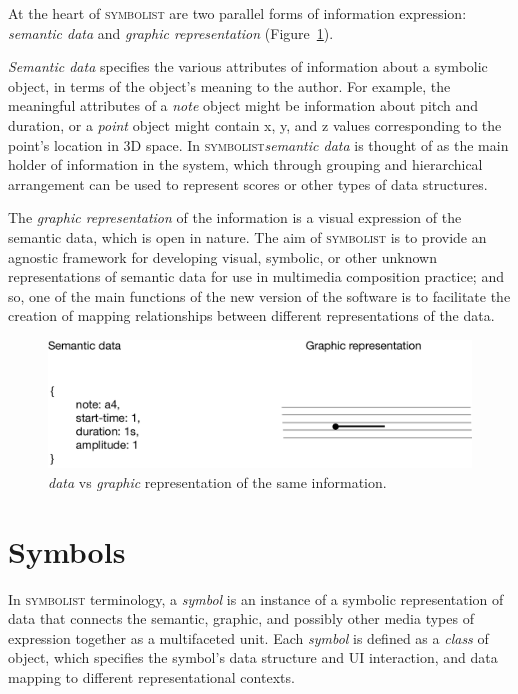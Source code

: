 \documentclass{article}
\def\symbolist{\textsc{symbolist}\xspace}
\begin{document}
At the heart of \symbolist are two parallel forms of information expression: \textit{semantic data} and \textit{graphic representation} (Figure~\ref{fig:graphic-representation}).

\textit{Semantic data} specifies the various attributes of information about a symbolic object, in terms of the object's meaning to the author. 
For example, the meaningful attributes of a \textit{note} object might be information about pitch and duration, or a \textit{point} object might contain x, y, and z values corresponding to the point's location in 3D space. In \symbolist \textit{semantic data} is thought of as the main holder of information in the system, which through grouping and hierarchical arrangement can be used to represent scores or other types of data structures.

The \textit{graphic representation} of the information is a visual expression of the semantic data, which is open in nature. The aim of \symbolist is to provide an agnostic framework for developing visual, symbolic, or other unknown representations of semantic data for use in multimedia composition practice; and so, one of the main functions of the new version of the software is to facilitate the creation of mapping relationships between different representations of the data.


\begin{figure}[ht!]
\centering
\includegraphics[width=1\columnwidth]{graphic-representation.pdf}
\caption{\textit{data} vs \textit{graphic} representation of the same information.
\label{fig:graphic-representation}}
\end{figure}



\section{Symbols}\label{sec:symbols}

In \symbolist terminology, a \textit{symbol} is an instance of a symbolic representation of data that connects the semantic, graphic, and possibly other media types of expression together as a multifaceted unit.
Each \textit{symbol} is defined as a \textit{class} of object, which specifies the symbol's data structure and UI interaction, and data mapping to different representational contexts.
\end{document}
